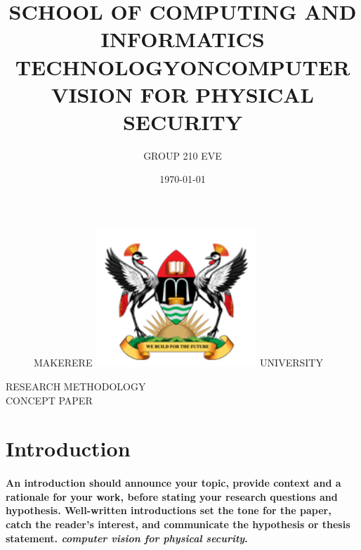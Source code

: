 \documentclass[11pt]{article}
\begin{document}
		
\title{SCHOOL OF COMPUTING AND INFORMATICS\\ TECHNOLOGY}
\author{GROUP 210 EVE}
\date{\today{}}
\begin{figure}
	\begin{center}
	\Huge MAKERERE \includegraphics[width=172pt]{muk.png} \Huge UNIVERSITY
	\end{center}
\end{figure}
	\maketitle
	
	\begin{center}
	RESEARCH METHODOLOGY \\CONCEPT PAPER
	\end{center}
\begin{center}
	\title{ON}
\end{center}
	\begin{center}
		\title{COMPUTER VISION FOR PHYSICAL SECURITY}
	\end{center}
    
	\newpage
	\tableofcontents
	
	\newpage
	\section{ \textbf{Introduction} }
	 \paragraph{\textmd{An introduction should announce your topic, provide context and a rationale for your work, before stating your research questions and hypothesis. Well-written introductions set the tone for the paper, catch the reader's interest, and communicate the hypothesis or thesis statement. \emph{computer vision for physical security}.}}
	 
\end{document}
